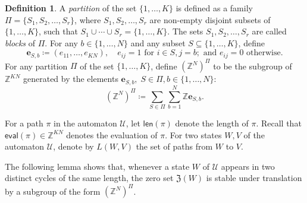 \documentclass[letterpaper, 11pt, thm-restate]{article}
\numberwithin{equation}{section}
\newcommand{\Z}{\mathbb{Z}}
\newcommand{\mZ}{\mathfrak{Z}}
\newcommand{\be}{\boldsymbol{e}}
\newcommand{\mmU}{\mathscr{U}}
\newcommand{\len}{\mathsf{len}}
\newcommand{\eval}{\mathsf{eval}}
\theoremstyle{definition}
\newtheorem{defn}[thrm]{Definition}
\theoremstyle{definition}
\theoremstyle{definition}
\begin{document}
\begin{defn}
    A \emph{partition} of the set $\{1, \ldots, K\}$ is defined as a family $\Pi = \{S_1, S_2, \ldots, S_r\}$, where $S_1, S_2, \ldots, S_r$ are non-empty disjoint subsets of $\{1, \ldots, K\}$, such that $S_1 \cup \cdots \cup S_r = \{1, \ldots, K\}$.
    The sets $S_1, S_2, \ldots, S_r$ are called \emph{blocks} of $\Pi$.
    For any $b \in \{1, \ldots, N\}$ and any subset $S \subseteq \{1, \ldots, K\}$, define
    \begin{equation}\label{eq:defeSb}
        \be_{S, b} \coloneqq (e_{11}, \ldots, e_{KN}), \quad e_{ij} = 1 \text{ for } i \in S, j = b; \text{ and } e_{ij} = 0 \text{ otherwise}.
    \end{equation}
    For any partition $\Pi$ of the set $\{1, \ldots, K\}$, define $(\Z^N)^{\Pi}$ to be the subgroup of $\Z^{KN}$ generated by the elements $\be_{S, b},\; S \in \Pi, b \in \{1, \ldots, N\}$:
    \[
    (\Z^N)^{\Pi} \coloneqq \sum_{S \in \Pi} \sum_{b = 1}^N \Z \be_{S, b}.
    \]
\end{defn}

For a path $\pi$ in the automaton $\mmU$, let $\len(\pi)$ denote the length of $\pi$.
Recall that $\eval(\pi) \in \Z^{KN}$ denotes the evaluation of $\pi$.
For two states $W, V$ of the automaton $\mmU$, denote by $L(W, V)$ the set of paths from $W$ to $V$.

The following lemma shows that, whenever a state $W$ of $\mmU$ appears in two distinct cycles of the same length, the zero set $\mZ(W)$ is stable under translation by a subgroup of the form $(\Z^N)^{\Pi}$.
\end{document}
